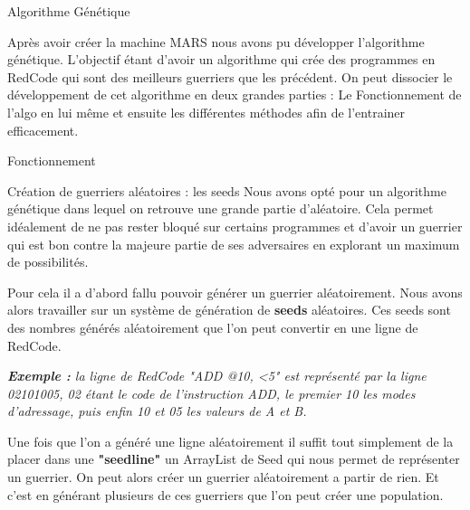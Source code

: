 \documentclass[a4paper, 10pt]{article}
\begin{document}
    \begin{section}{Algorithme Génétique}
        \par
            Après avoir créer la machine MARS nous avons pu développer l'algorithme génétique. L'objectif étant d'avoir un algorithme qui crée des programmes en RedCode qui sont des meilleurs guerriers que les précédent. On peut dissocier le développement de cet algorithme en deux grandes parties : Le Fonctionnement de l'algo en lui même et ensuite les différentes méthodes afin de l'entrainer efficacement.
            \medskip

        \begin{subsection}{Fonctionnement}

            \begin{subsubsection}{Création de guerriers aléatoires : les seeds}
                \sloppypar
                    Nous avons opté pour un algorithme génétique dans lequel on retrouve une grande partie d'aléatoire. Cela permet idéalement de ne pas rester bloqué sur certains programmes et d'avoir un guerrier qui est bon contre la majeure partie de ses adversaires en explorant un maximum de possibilités.
                    \smallskip
                \par
                    Pour cela il a d'abord fallu pouvoir générer un guerrier aléatoirement. Nous avons alors travailler sur un système de génération de \textbf{seeds} aléatoires. Ces seeds sont des nombres générés aléatoirement que l'on peut convertir en une ligne de RedCode. 
                    \medskip
                \par
                    \textit{\textbf{Exemple :} la ligne de RedCode "ADD @10, <5" est représenté par la ligne 02101005, 02 étant le code de l'instruction ADD, le premier 10 les modes d'adressage, puis enfin 10 et 05 les valeurs de A et B.}
                    \bigskip
                \par
                    Une fois que l'on a généré une ligne aléatoirement il suffit tout simplement de la placer dans une \textbf{"seedline"} un ArrayList de Seed qui nous permet de représenter un guerrier. On peut alors créer un guerrier aléatoirement a partir de rien. Et c'est en générant plusieurs de ces guerriers que l'on peut créer une population.
                    \bigskip
            \end{subsubsection}


\end{subsection}
\end{section}
\end{document}
